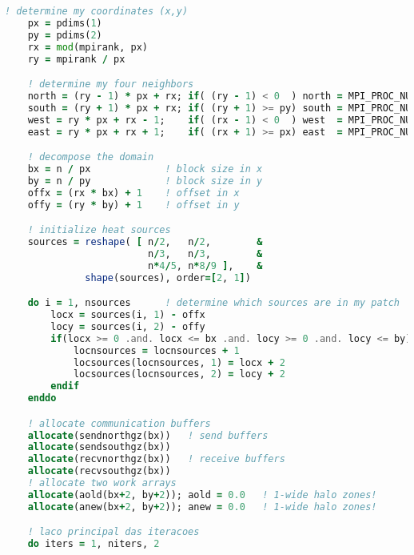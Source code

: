 \begin{lstlisting}[language=Fortran, caption={Parallel F90 implementation of the stencil test case.}]
    ! determine my coordinates (x,y)
    px = pdims(1)
    py = pdims(2)
    rx = mod(mpirank, px)
    ry = mpirank / px

    ! determine my four neighbors
    north = (ry - 1) * px + rx; if( (ry - 1) < 0  ) north = MPI_PROC_NULL
    south = (ry + 1) * px + rx; if( (ry + 1) >= py) south = MPI_PROC_NULL
    west = ry * px + rx - 1;    if( (rx - 1) < 0  ) west  = MPI_PROC_NULL
    east = ry * px + rx + 1;    if( (rx + 1) >= px) east  = MPI_PROC_NULL

    ! decompose the domain   
    bx = n / px             ! block size in x
    by = n / py             ! block size in y
    offx = (rx * bx) + 1    ! offset in x
    offy = (ry * by) + 1    ! offset in y

    ! initialize heat sources
    sources = reshape( [ n/2,   n/2,        &
                         n/3,   n/3,        &
                         n*4/5, n*8/9 ],    &
              shape(sources), order=[2, 1])

    do i = 1, nsources      ! determine which sources are in my patch
        locx = sources(i, 1) - offx
        locy = sources(i, 2) - offy    
        if(locx >= 0 .and. locx <= bx .and. locy >= 0 .and. locy <= by) then
            locnsources = locnsources + 1
            locsources(locnsources, 1) = locx + 2
            locsources(locnsources, 2) = locy + 2
        endif
    enddo

    ! allocate communication buffers
    allocate(sendnorthgz(bx))   ! send buffers
    allocate(sendsouthgz(bx))
    allocate(recvnorthgz(bx))   ! receive buffers
    allocate(recvsouthgz(bx))
    ! allocate two work arrays
    allocate(aold(bx+2, by+2)); aold = 0.0   ! 1-wide halo zones!
    allocate(anew(bx+2, by+2)); anew = 0.0   ! 1-wide halo zones!

    ! laco principal das iteracoes
    do iters = 1, niters, 2


\end{lstlisting}
